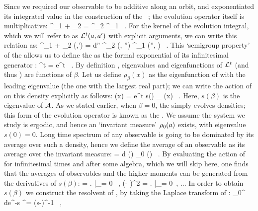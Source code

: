 Since we required our observable to be additive along an orbit, and 
exponentiated its integrated value in the construction of the \evOper\ 
; the evolution operator itself is multiplicative:
\beq
    \Lop^{\zeit_1 + \zeit_2} = \Lop^{\zeit_2} \Lop^{\zeit_1} \, .
    \label{eq-SemiGroup}
\eeq
For the kernel of the evolution integral, which we will refer to as 
${\cal L}^{t} (a, a')$ with explicit arguments, we can write this relation 
as:
\beq
	\Lop^{\zeit_1 + \zeit_2} (\ssp,\ssp') = 
    \int d\ssp'' \Lop^{\zeit_2} (\ssp, \ssp'') 
                   \Lop^{\zeit_1} (\ssp'', \ssp) \, .
	\label{eq-SemiGroupKernel}
\eeq
This `semigroup property'  of the {\evOper} allows us to 
define the {\evOper} as the formal exponential of its infinitesimal generator 
\Aop :
\beq
	\Lop^t = e^{\Aop t} \, .
	\label{eq-EvOpExp}
\eeq
By definition , eigenvalues and eigenfunctions of ${\cal L}^t$ (and
thus \Aop ) are functions of $\beta$. Let us define $\rho_{\beta} (x)$ as the
eigenfunction of  with the leading eigenvalue (the one with the
largest real part); we can write the action of \refeq{e-EvOper} on this density
explicitly as follows:
\beq
     (x) = e^{t s(\beta )} \rho_{\beta} (x) \, .
    \label{eq-EigenvalueRel}
\eeq
Here, $s(\beta)$ is the eigenvalue of ${\cal A}$. As we stated earlier, when 
$\beta = 0$, the {\evOper} simply evolves densities; this form of the evolution
operator is known as the {\FPoper}. We assume the system we study is ergodic, 
and hence an `invariant measure' $\rho_0(a)$ exists, with eigenvalue 
$s(0) = 0$. Long time spectrum of any observable is going to be dominated by 
its average over such a density, hence we define the average of an observable
as its average over the invariant measure:
\beq
    \langle \obser \rangle = \int d \ssp \obser(\ssp) \rho_0 (\ssp) \, .
    \label{e-obserAvg}
\eeq
By evaluating the action of {\evOper}  for infinitesimal 
times and after some algebra, which we will skip here, one finds that the 
averages of observables and the higher moments can be generated from the 
derivatives of $s(\beta)$:
\beq
    \langle \obser \rangle = 
        \left.  \right|_{\beta = 0} \, , \quad
    \langle (\obser - \langle \obser \rangle )^2 \rangle = 
        \left.  \right|_{\beta = 0} \,, ...
    \label{eq-moments}
\eeq
In order to obtain $s(\beta)$ we construct the resolvent of \Aop , by taking 
the Laplace transform of \refeq{eq-EvOpExp}:
\beq
	\int_0^{\infty} d\zeit e^{-s\zeit} \Lop^\zeit = (s-\Aop)^{-1} \, ,
